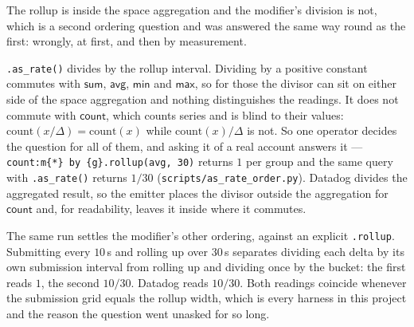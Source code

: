 \begin{remark}\label{rem:as-rate-placement}
The rollup is inside the space aggregation and the modifier's division is not, which is
a second ordering question and was answered the same way round as the first: wrongly, at
first, and then by measurement.

\texttt{.as\_rate()} divides by the rollup interval. Dividing by a positive constant
commutes with $\mathsf{sum}$, $\mathsf{avg}$, $\mathsf{min}$ and $\mathsf{max}$, so for
those the divisor can sit on either side of the space aggregation and nothing
distinguishes the readings. It does not commute with $\mathsf{count}$, which counts
series and is blind to their values: $\mathrm{count}(x/\Delta) = \mathrm{count}(x)$
while $\mathrm{count}(x)/\Delta$ is not. So one operator decides the question for all
of them, and asking it of a real account answers it ---
\texttt{count:m\{*\} by \{g\}.rollup(avg, 30)} returns $1$ per group and the same
query with \texttt{.as\_rate()} returns $1/30$
(\texttt{scripts\slash as\_rate\_order.py}). Datadog divides the aggregated result, so
the emitter places the divisor outside the aggregation for $\mathsf{count}$ and, for
readability, leaves it inside where it commutes.

The same run settles the modifier's other ordering, against an explicit
\texttt{.rollup}. Submitting every $10$\,s and rolling up over $30$\,s separates
dividing each delta by its own submission interval from rolling up and dividing once by
the bucket: the first reads $1$, the second $10/30$. Datadog reads $10/30$. Both
readings coincide whenever the submission grid equals the rollup width, which is every
harness in this project and the reason the question went unasked for so long.
\end{remark}
